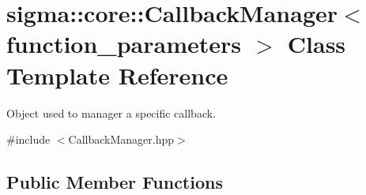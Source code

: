 \hypertarget{classsigma_1_1core_1_1_callback_manager}{}\section{sigma\+:\+:core\+:\+:Callback\+Manager$<$ function\+\_\+parameters $>$ Class Template Reference}
\label{classsigma_1_1core_1_1_callback_manager}


Object used to manager a specific callback.  




{\ttfamily \#include $<$Callback\+Manager.\+hpp$>$}

\subsection*{Public Member Functions}
